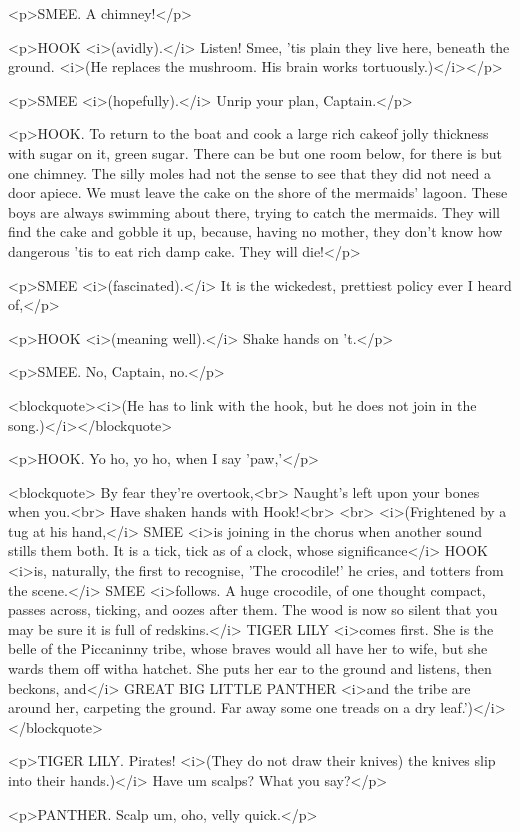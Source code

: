 <p>SMEE. A chimney!</p>

<p>HOOK <i>(avidly).</i> Listen! Smee, 'tis plain they live here, beneath the ground. <i>(He replaces the mushroom. His brain works tortuously.)</i></p>

<p>SMEE <i>(hopefully).</i> Unrip your plan, Captain.</p>

<p>HOOK. To return to the boat and cook a large rich cakeof jolly thickness with sugar on it, green sugar. There can be but one room below, for there is but one chimney. The silly moles had not the sense to see that they did not need a door apiece. We must leave the cake on the shore of the mermaids' lagoon. These boys are always swimming about there, trying to catch the mermaids. They will find the cake and gobble it up, because, having no mother, they don't know how dangerous 'tis to eat rich damp cake. They will die!</p>

<p>SMEE <i>(fascinated).</i> It is the wickedest, prettiest policy ever I heard of,</p>

<p>HOOK <i>(meaning well).</i> Shake hands on 't.</p>

<p>SMEE. No, Captain, no.</p>

<blockquote><i>(He has to link with the hook, but he does not join in the song.)</i></blockquote>

<p>HOOK. Yo ho, yo ho, when I say 'paw,'</p>

<blockquote> By fear they're overtook,<br> Naught's left upon your bones when you.<br> Have shaken hands with Hook!<br> <br> <i>(Frightened by a tug at his hand,</i> SMEE <i>is joining in the chorus when another sound stills them both. It is a tick, tick as of a clock, whose significance</i> HOOK <i>is, naturally, the first to recognise, 'The crocodile!' he cries, and totters from the scene.</i> SMEE <i>follows. A huge crocodile, of one thought compact, passes across, ticking, and oozes after them. The wood is now so silent that you may be sure it is full of redskins.</i> TIGER LILY <i>comes first. She is the belle of the Piccaninny tribe, whose braves would all have her to wife, but she wards them off witha hatchet. She puts her ear to the ground and listens, then beckons, and</i> GREAT BIG LITTLE PANTHER <i>and the tribe are around her, carpeting the ground. Far away some one treads on a dry leaf.')</i></blockquote>

<p>TIGER LILY. Pirates! <i>(They do not draw their knives) the knives slip into their hands.)</i> Have um scalps? What you say?</p>

<p>PANTHER. Scalp um, oho, velly quick.</p>


